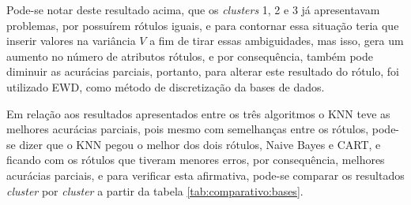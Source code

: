 Pode-se notar deste resultado acima, que os \textit{clusters} 1, 2 e 3 já apresentavam problemas, por possuírem rótulos iguais, e para contornar essa situação teria que inserir valores na variância ${V}$ a fim de tirar essas ambiguidades, mas isso, gera um aumento no número de atributos rótulos, e por consequência, também pode diminuir as  acurácias parciais, portanto, para alterar este resultado do rótulo, foi utilizado EWD, como método de discretização da bases de dados.
 
Em relação aos resultados apresentados entre os três algoritmos o KNN teve as melhores acurácias parciais, pois mesmo com semelhanças entre os rótulos, pode-se dizer que o KNN pegou o melhor dos dois rótulos, Naive Bayes e CART, e ficando com os rótulos que tiveram menores erros, por consequência, melhores acurácias parciais, e para verificar esta afirmativa, pode-se comparar os resultados \textit{cluster} por \textit{cluster} a partir da tabela \ref{tab:comparativo:bases}.

